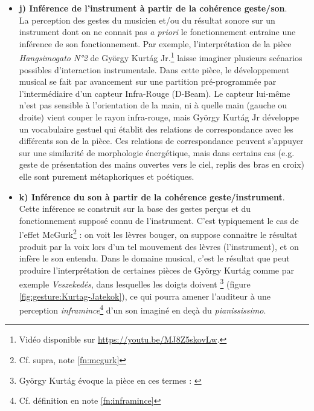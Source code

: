 \begin{itemize}[noitemsep]
	\item \textbf{j) Inférence de l'instrument à partir de la cohérence geste/son}.\\
	La perception des gestes du musicien et/ou du résultat sonore sur un instrument dont on ne connait pas \textit{a priori} le fonctionnement entraine une inférence de son fonctionnement. Par exemple, l'interprétation de la pièce \textit{Hangsimogato N°2} de György Kurtág Jr.\footnote{Vidéo disponible sur \url{https://youtu.be/MJ8Z5skovLw}.} laisse imaginer plusieurs scénarios possibles d'interaction instrumentale. Dans cette pièce, le développement musical se fait par avancement sur une partition pré-programmée par l'intermédiaire d'un capteur Infra-Rouge (D-Beam). Le capteur lui-même n'est pas sensible à l'orientation de la main, ni à quelle main (gauche ou droite) vient couper le rayon infra-rouge, mais György Kurtág Jr développe un vocabulaire gestuel qui établit des relations de correspondance avec les différents son de la pièce. Ces relations de correspondance peuvent s'appuyer sur une similarité de morphologie énergétique, mais dans certains cas (e.g. geste de présentation des mains ouvertes vers le ciel, replis des bras en croix) elle sont purement métaphoriques et poétiques.

	\item \textbf{k) Inférence du son à partir de la cohérence geste/instrument}.\\
	Cette inférence se construit sur la base des gestes perçus et du fonctionnement supposé connu de l'instrument. C'est typiquement le cas de l'effet McGurk\footnote{Cf. supra, note \ref{fn:mcgurk}} : on voit les lèvres bouger, on suppose connaitre le résultat produit par la voix lors d'un tel mouvement des lèvres (l'instrument), et on infère le son entendu. Dans le domaine musical, c'est le résultat que peut produire l'interprétation de certaines pièces de György Kurtág comme par exemple \textit{Veszekedés}, dans lesquelles les doigts doivent \footnote{György Kurtág évoque la pièce en ces termes :  \cite{kurtag_gyorgy_2018}} (figure \ref{fig:gesture:Kurtag-Jatekok}), ce qui pourra amener l'auditeur à une perception \textit{inframince}\footnote{Cf. définition en note \ref{fn:inframince}} d'un son imaginé en deçà du \textit{pianississimo}.


\end{itemize}

